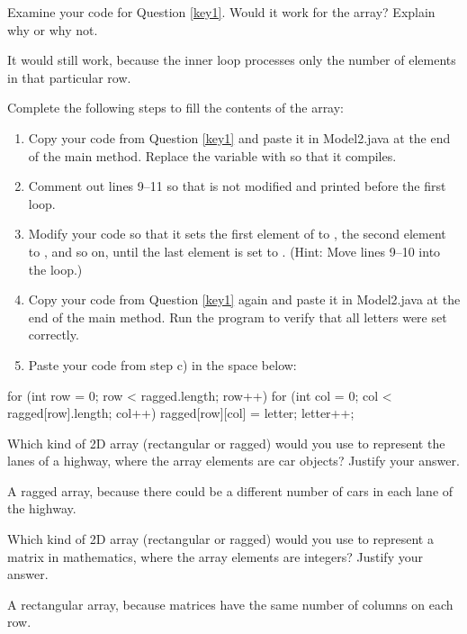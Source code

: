 \Q Examine your code for Question \ref{key1}.
Would it work for the  array?
Explain why or why not.

\begin{answer}[3em]
It would still work, because the inner loop processes only the number of elements in that particular row.
\end{answer}


\Q \label{key3}
Complete the following steps to fill the contents of the  array:

\begin{enumerate}
\item Copy your code from Question \ref{key1} and paste it in Model2.java at the end of the main method.
Replace the variable  with  so that it compiles.

\item Comment out lines 9--11 so that  is not modified and printed before the first loop.

\item Modify your code so that it sets the first element of  to , the second element to , and so on, until the last element is set to .
(Hint: Move lines 9--10 into the loop.)

\item Copy your code from Question \ref{key1} again and paste it in Model2.java at the end of the main method. Run the program to verify that all letters were set correctly.

\item Paste your code from step c) in the space below:
\end{enumerate}

\begin{answer}[9em]
\begin{javaans}
for (int row = 0; row < ragged.length; row++) {
    for (int col = 0; col < ragged[row].length; col++) {
        ragged[row][col] = letter;
        letter++;
    }
}
\end{javaans}
\end{answer}


\Q Which kind of 2D array (rectangular or ragged) would you use to represent the lanes of a highway, where the array elements are car objects? Justify your answer.

\begin{answer}[3em]
A ragged array, because there could be a different number of cars in each lane of the highway.
\end{answer}


\Q Which kind of 2D array (rectangular or ragged) would you use to represent a matrix in mathematics, where the array elements are integers? Justify your answer.

\begin{answer}[3em]
A rectangular array, because matrices have the same number of columns on each row.
\end{answer}
